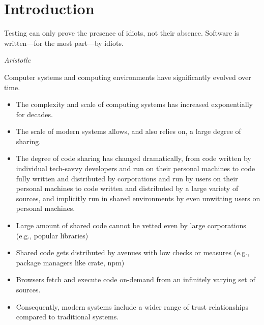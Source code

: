 \chapter{Introduction}
\epigraph{Testing can only prove the presence of idiots, not their absence. Software is written---for the most part---by idiots.}%
         {\textit{Aristotle}}

Computer systems and computing environments have significantly evolved over time.
\begin{itemize}
  \item The complexity and scale of computing systems has increased exponentially for decades. 
  \item The scale of modern systems allows, and also relies on, a large degree of sharing. 
  \item The degree of code sharing has changed dramatically, 
        from 
        code written by individual tech-savvy developers and run on their personal machines
        to 
        code fully written and distributed by corporations and run by users on their personal machines
        to
        code written and distributed by a large variety of sources, and implicitly run in shared environments
        by even unwitting users on personal machines.
  \item Large amount of shared code cannot be vetted even by large corporations (e.g., popular libraries)
  \item Shared code gets distributed by avenues with low checks or measures (e.g., package managers like crate, npm)
  \item Browsers fetch and execute code on-demand from an infinitely varying set of sources.
  \item Consequently, modern systems include a wider range of trust relationships compared to traditional systems.
\end{itemize}

